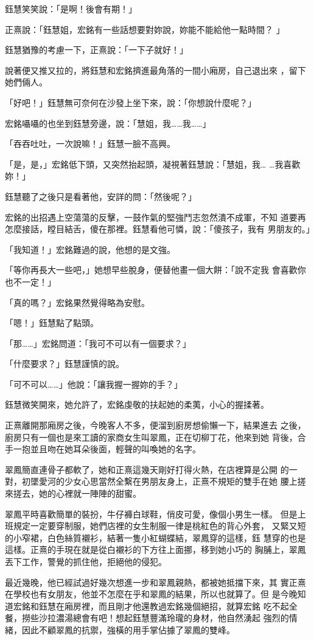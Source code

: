 鈺慧笑笑說：「是啊！後會有期！」

正熹說：「鈺慧姐，宏銘有一些話想要對妳說，妳能不能給他一點時間？
」

鈺慧猶豫的考慮一下，正熹說：「一下子就好！」

說著便又推又拉的，將鈺慧和宏銘擠進最角落的一間小廂房，自己退出來
，留下她們倆人。

「好吧！」鈺慧無可奈何在沙發上坐下來，說：「你想說什麼呢？」

宏銘囁囁的也坐到鈺慧旁邊，說：「慧姐，我……我……」

「吞吞吐吐，一次說嘛！」鈺慧一臉不高興。

「是，是，」宏銘低下頭，又突然抬起頭，凝視著鈺慧說：「慧姐，我…
…我喜歡妳！」

鈺慧聽了之後只是看著他，安詳的問：「然後呢？」

宏銘的出招遇上空蕩蕩的反擊，一鼓作氣的堅強鬥志忽然潰不成軍，不知
道要再怎麼接話，瞠目結舌，傻在那裡。鈺慧看他可憐，說：「傻孩子，我有
男朋友的。」

「我知道！」宏銘難過的說，他想的是文強。

「等你再長大一些吧，」她想早些脫身，便替他畫一個大餅：「說不定我
會喜歡你也不一定！」

「真的嗎？」宏銘果然覺得略為安慰。

「嗯！」鈺慧點了點頭。

「那……」宏銘問道：「我可不可以有一個要求？」

「什麼要求？」鈺慧謹慎的說。

「可不可以……」他說：「讓我握一握妳的手？」

鈺慧微笑開來，她允許了，宏銘虔敬的扶起她的柔荑，小心的握揉著。

正熹離開那廂房之後，今晚客人不多，便溜到廚房想偷懶一下，結果進去
之後，廚房只有一個也是來工讀的家商女生叫翠鳳，正在切柳丁花，他來到她
背後，合手一抱並且吻在她耳朵後面，輕聲的叫喚她的名字。

翠鳳簡直連骨子都軟了，她和正熹這幾天剛好打得火熱，在店裡算是公開
的一對，初墜愛河的少女心思當然全繫在男朋友身上，正熹不規矩的雙手在她
腰上搓來搓去，她的心裡就一陣陣的甜蜜。

翠鳳平時喜歡簡單的裝扮，牛仔褲白球鞋，俏皮可愛，像個小男生一樣。
但是上班規定一定要穿制服，她們店裡的女生制服一律是桃紅色的背心外套，
又緊又短的小窄裙，白色絲質襯衫，結著一隻小紅蝴蝶結，翠鳳穿的這樣，鈺
慧穿的也是這樣。正熹的手現在就是從白襯衫的下方往上面挪，移到她小巧的
胸脯上，翠鳳丟下工作，警覺的抓住他，拒絕他的侵犯。

最近幾晚，他已經試過好幾次想進一步和翠鳳親熱，都被她抵擋下來，其
實正熹在學校也有女朋友，他並不怎麼在乎和翠鳳的結果，所以也就算了。但
是今晚知道宏銘和鈺慧在廂房裡，而且剛才他還教過宏銘幾個絕招，就算宏銘
吃不起全餐，撈些沙拉濃湯總會有吧！想起鈺慧豐滿玲瓏的身材，他自然湧起
強烈的情緒，因此不顧翠鳳的抗禦，強橫的用手掌佔據了翠鳳的雙峰。

